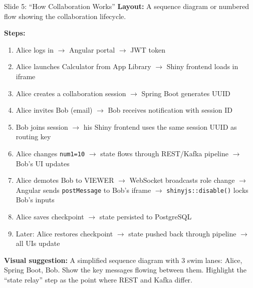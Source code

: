 \documentclass[12pt,a4paper]{article}
\begin{document}
\begin{slidebox}{Slide 5: ``How Collaboration Works''}
\textbf{Layout:} A sequence diagram or numbered flow showing the collaboration lifecycle.

\textbf{Steps:}
\begin{enumerate}[nosep]
  \item Alice logs in $\rightarrow$ Angular portal $\rightarrow$ JWT token
  \item Alice launches Calculator from App Library $\rightarrow$ Shiny frontend loads in iframe
  \item Alice creates a collaboration session $\rightarrow$ Spring Boot generates UUID
  \item Alice invites Bob (email) $\rightarrow$ Bob receives notification with session ID
  \item Bob joins session $\rightarrow$ his Shiny frontend uses the same session UUID as routing key
  \item Alice changes \texttt{num1=10} $\rightarrow$ state flows through REST/Kafka pipeline $\rightarrow$ Bob's UI updates
  \item Alice demotes Bob to VIEWER $\rightarrow$ WebSocket broadcasts role change $\rightarrow$ Angular sends \texttt{postMessage} to Bob's iframe $\rightarrow$ \texttt{shinyjs::disable()} locks Bob's inputs
  \item Alice saves checkpoint $\rightarrow$ state persisted to PostgreSQL
  \item Later: Alice restores checkpoint $\rightarrow$ state pushed back through pipeline $\rightarrow$ all UIs update
\end{enumerate}

\textbf{Visual suggestion:} A simplified sequence diagram with 3 swim lanes: Alice, Spring Boot, Bob. Show the key messages flowing between them. Highlight the ``state relay'' step as the point where REST and Kafka differ.
\end{slidebox}
\end{document}

